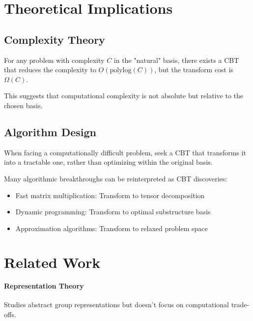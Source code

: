 \documentclass[12pt,a4paper]{article}
\theoremstyle{definition}
\begin{document}
\section{Theoretical Implications}

\subsection{Complexity Theory}

\begin{conjecture}
For any problem with complexity $C$ in the "natural" basis, there exists a CBT that reduces the complexity to $O(\text{polylog}(C))$, but the transform cost is $\Omega(C)$.
\end{conjecture}

This suggests that computational complexity is not absolute but relative to the chosen basis.

\subsection{Algorithm Design}

\begin{principle}
When facing a computationally difficult problem, seek a CBT that transforms it into a tractable one, rather than optimizing within the original basis.
\end{principle}

Many algorithmic breakthroughs can be reinterpreted as CBT discoveries:
\begin{itemize}
\item Fast matrix multiplication: Transform to tensor decomposition
\item Dynamic programming: Transform to optimal substructure basis
\item Approximation algorithms: Transform to relaxed problem space
\end{itemize}

\section{Related Work}

\paragraph{Representation Theory} Studies abstract group representations but doesn't focus on computational trade-offs.
\end{document}
